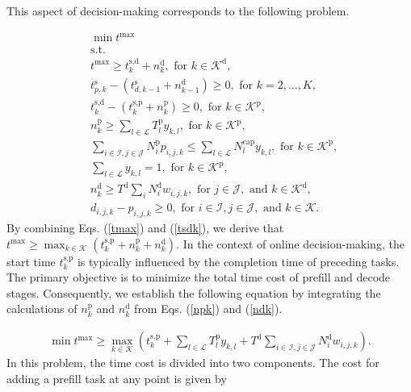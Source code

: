 This aspect of decision-making corresponds to the following problem.

\begin{align}
    &\nonumber \min t^\text{max} \\
    & \nonumber \text{s.t.} \\
    \label{tmax}
    & t^\text{max} \geq t_{k}^\text{s,d} + n_{k}^\text{d}, \text{ for } k \in \mathcal{K}^\text{d}, \\
    & t^{\text{s}}_{p,k} - (t^{\text{s}}_{d,k-1} + n^{\text{d}}_{k-1}) \geq 0,  \text{ for } k = 2,...,K,\\
    \label{tsdk}
    & t^{\text{s,d}}_{k} - (t^{\text{s,p}}_{k} + n^{\text{p}}_{k}) \geq 0,  \text{ for } k \in \mathcal{K}^\text{p},\\ 
    \label{npk}
    & n^{\text{p}}_{k} \geq \sum_{l\in \mathcal{L}} T^{\text{p}}_l y_{k,l}, \text{ for } k \in \mathcal{K}^\text{p},\\
    & \sum_{i\in \mathcal{I},j\in \mathcal{J}} N_i^{\text{p}} p_{i,j,k} \leq \sum_{l\in \mathcal{L}} N^{\text{cap}}_l y_{k,l}, \text{ for } k \in \mathcal{K}^\text{p}, \\ 
    & \sum_{l\in \mathcal{L}} y_{k,l} = 1, \text{ for } k \in \mathcal{K}^\text{p}, \\
    \label{ndk}
    & n^{\text{d}}_{k} \geq T^{\text{d}} \sum_{i} N_i^{\text{d}} w_{i,j,k}, \text{ for } j\in \mathcal{J}, \text{ and } k \in \mathcal{K}^\text{d},\\
    & d_{i,j,k} - p_{i,j,k} \geq 0, \text{ for } i\in \mathcal{I}, j\in \mathcal{J}, \text{ and } k \in \mathcal{K}.
\end{align}
By combining Eqs. (\ref{tmax}) and (\ref{tsdk}), we derive that $t^{\text{max}} \geq \max_{k \in \mathcal{K}} \left(t^\text{{s,p}}_{k} + n^\text{p}_{k} + n^\text{d}_{k}\right) $. In the context of online decision-making, the start time $t^\text{{s,p}}_{k}$ is typically influenced by the completion time of preceding tasks. The primary objective is to minimize the total time cost of prefill and decode stages. Consequently, we establish the following equation by integrating the calculations of $n^\text{p}_{k}$ and $n^\text{d}_{k}$ from Eqs. (\ref{npk}) and (\ref{ndk}).

\begin{align}
    \min t^\text{max} \geq \max_{k \in \mathcal{K}} \left( t^\text{s,p}_{k} + \sum_{l\in \mathcal{L}} T^\text{p}_l y_{k,l} + T^\text{d} \sum_{i \in \mathcal{I}, j\in \mathcal{J}} N_i^\text{d} w_{i,j,k} \right).
\end{align}
In this problem, the time cost is divided into two components. The cost for adding a prefill task at any point is given by

